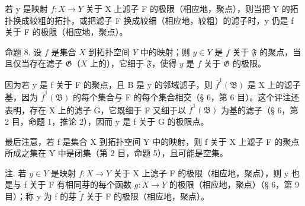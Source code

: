 若 y 是映射 \(f: X \rightarrow Y\) 关于 X 上滤子 F 的极限（相应地，聚点），则当把 Y 的拓扑换成较粗的拓扑，或把滤子 F 换成较细（相应地，较粗）的滤子时，y 仍是 f 关于 F 的极限（相应地，聚点）。

命题 8. 设 \(f\) 是集合 \(X\) 到拓扑空间 \(Y\) 中的映射；则 \(y \in Y\) 是 \(f\) 关于 \(\mathfrak{F}\) 的聚点，当且仅当存在滤子 \(\mathfrak{G}\)（\(X\) 上的），它细于 \(\mathfrak{F}\)，使得 \(y\) 是 \(f\) 关于 \(\mathfrak{G}\) 的极限。

因为若 y 是 f 关于 F 的聚点，且 B 是 y 的邻域滤子，则 \(\overline{f}^{1}(\mathfrak{B})\) 是 X 上的滤子基，因为 \(\overline{f}^{1}(\mathfrak{B})\) 的每个集合与 F 的每个集合相交（§ 6，第 6 目）。这个评注还表明，存在 X 上的滤子 G，它既细于 F 又细于以 \(\overline{f}^{1}(\mathfrak{B})\) 为基的滤子（§ 6，第 2 目，命题 1，推论 2），因而 y 是 f 关于 G 的极限点。

最后注意，若 f 是集合 X 到拓扑空间 Y 中的映射，则 f 关于 X 上滤子 F 的聚点所成之集在 Y 中是闭集（第 2 目，命题 5），且可能是空集。

注. 若 \(y \in Y\) 是映射 \(f: X \to Y\) 关于 X 上滤子 F 的极限（相应地，聚点），则 y 也是与 f 关于 F 有相同芽的每个函数 \(g: X \to Y\) 的极限（相应地，聚点）（§ 6，第 9 目）；称 y 为 f 的芽 \(\tilde{f}\) 关于 F 的极限（相应地，聚点）。

